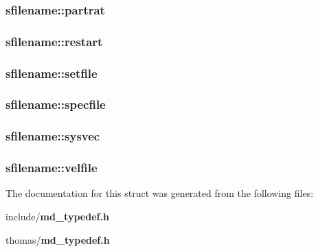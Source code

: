 \subsubsection{ {\bf sfilename::partrat}}\label{structsfilename_a0c51d2b5789fd67bd77563f63b2e34a}


\subsubsection{ {\bf sfilename::restart}}\label{structsfilename_4ce141060e2d981063368f29eb11eb84}


\subsubsection{ {\bf sfilename::setfile}}\label{structsfilename_803d47b0078634da6d49a4b22ad9a2a6}


\subsubsection{ {\bf sfilename::specfile}}\label{structsfilename_69e3b7b3db02a92b088c5f50e65b4699}


\subsubsection{ {\bf sfilename::sysvec}}\label{structsfilename_082c34b323960de5416e37c88fcb8a4f}


\subsubsection{ {\bf sfilename::velfile}}\label{structsfilename_31b3329c3a7fab5494aea844e3433cfb}




The documentation for this struct was generated from the following files:\begin{CompactItemize}
\item 
include/{\bf md\_\-typedef.h}\item 
thomas/{\bf md\_\-typedef.h}\end{CompactItemize}
